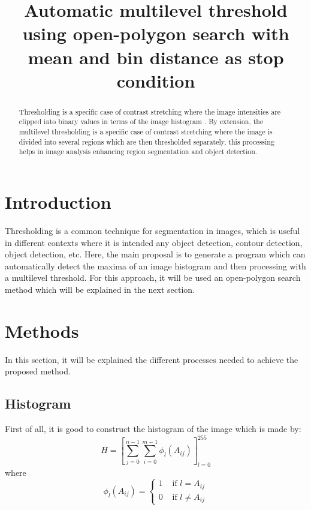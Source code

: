 \documentclass[pdflatex,sn-mathphys-num]{sn-jnl}
\title[Automatic Multilevel Threshold]{%
  Automatic multilevel threshold using open-polygon search with mean and bin distance as stop condition
}
\author[1]{%
  \fnm{Brandon} \sur{Marquez-Salazar}
}
\affil[1]{%
  \orgname{Universidad de Guanajuato}, \city{Guanajuato}, \country{Mexico}
}
\begin{document}
  \maketitle

  \begin{abstract}
    Thresholding is a specific case of contrast stretching where 
    the image intensities are clipped into binary values in terms of
    the image histogram \cite{Jain1988-ak}.
    By extension, the multilevel thresholding is a specific case of
    contrast stretching where the image is divided into several
    regions which are then thresholded separately, this processing
    helps in image analysis enhancing region segmentation and
    object detection.
  \end{abstract}


  \section{Introduction}
  Thresholding is a common technique for segmentation in images, which is useful
  in different contexts where it is intended any object detection, contour detection,
  object detection, etc.
  Here, the main proposal is to generate a program which can automatically detect
  the maxima of an image histogram and then processing with a multilevel threshold.
  For this approach, it will be used an open-polygon search method which will be explained
  in the next section.

  \section{Methods}
  In this section, it will be explained the different processes needed to achieve 
  the proposed method.

  \subsection{Histogram}
  First of all, it is good to construct the histogram of the image which is made by:
  \begin{equation}
    H = \left[\sum_{j=0}^{n-1} \sum_{i=0}^{m-1} \phi_l(A_{ij})\right]_{l=0}^{255}
  \end{equation}
  where
  \begin{equation}
    \phi_l(A_{ij}) =
    \begin{cases}
      1 & \text{ if } l = A_{ij} \\
      0 & \text{ if } l \neq A_{ij}
    \end{cases}
  \end{equation}
  
\end{document}
